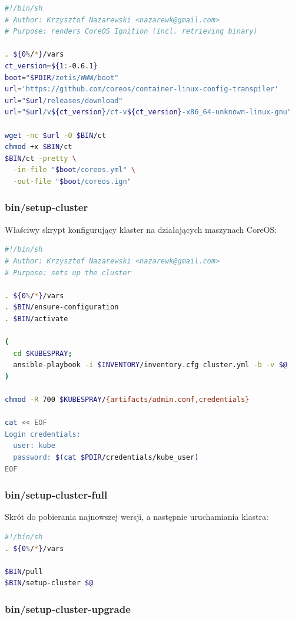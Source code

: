 \documentclass[a4paper,12pt,twoside,openany]{report}
\begin{document}
\begin{lstlisting}[language=bash]
#!/bin/sh
# Author: Krzysztof Nazarewski <nazarewk@gmail.com>
# Purpose: renders CoreOS Ignition (incl. retrieving binary)

. ${0%/*}/vars
ct_version=${1:-0.6.1}
boot="$PDIR/zetis/WWW/boot"
url='https://github.com/coreos/container-linux-config-transpiler'
url="$url/releases/download"
url="$url/v${ct_version}/ct-v${ct_version}-x86_64-unknown-linux-gnu"

wget -nc $url -O $BIN/ct
chmod +x $BIN/ct
$BIN/ct -pretty \
  -in-file "$boot/coreos.yml" \
  -out-file "$boot/coreos.ign"
\end{lstlisting}

\hypertarget{binsetup-cluster}{%
\subsubsection{bin/setup-cluster}\label{binsetup-cluster}}

Właściwy skrypt konfigurujący klaster na działających maszynach CoreOS:

\begin{lstlisting}[language=bash]
#!/bin/sh
# Author: Krzysztof Nazarewski <nazarewk@gmail.com>
# Purpose: sets up the cluster

. ${0%/*}/vars
. $BIN/ensure-configuration
. $BIN/activate

(
  cd $KUBESPRAY;
  ansible-playbook -i $INVENTORY/inventory.cfg cluster.yml -b -v $@
)

chmod -R 700 $KUBESPRAY/{artifacts/admin.conf,credentials}

cat << EOF
Login credentials:
  user: kube
  password: $(cat $PDIR/credentials/kube_user)
EOF
\end{lstlisting}

\hypertarget{binsetup-cluster-full}{%
\subsubsection{bin/setup-cluster-full}\label{binsetup-cluster-full}}

Skrót do pobierania najnowszej wersji, a następnie uruchamiania klastra:

\begin{lstlisting}[language=bash]
#!/bin/sh
. ${0%/*}/vars

$BIN/pull
$BIN/setup-cluster $@
\end{lstlisting}

\hypertarget{binsetup-cluster-upgrade}{%
\subsubsection{bin/setup-cluster-upgrade}\label{binsetup-cluster-upgrade}}
\end{document}
